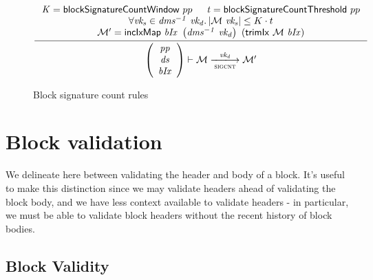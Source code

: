 \documentclass[11pt,a4paper]{article}
\newcommand{\var}[1]{\mathit{#1}}
\newcommand{\fun}[1]{\mathsf{#1}}
\newcommand{\size}[1]{\left| #1 \right|}
\newcommand{\trans}[2]{\xlongrightarrow[\textsc{#1}]{#2}}
\newcommand{\signmapname}{\mathcal{M}}
\newcommand{\trimixname}{trimIx}
\newcommand{\incixmapname}{incIxMap}
\newcommand{\signmap}[1]{\fun{\signmapname} ~ #1}
\newcommand{\trimix}[2]{\fun{\trimixname} ~ #1 ~ #2}
\newcommand{\incixmap}[3]{\fun{\incixmapname} ~ #1 ~ #2 ~ #3}
\begin{document}
\begin{figure}[ht]
  \begin{equation*}
    \inference
    {
      \var{K} = \fun{blockSignatureCountWindow} ~ pp & \var{t} = \fun{blockSignatureCountThreshold} ~ pp \\
      \forall \var{vk_s} \in \var{dms^{-1}} ~ \var{vk_d} . \size{\signmap{\var{vk_s}}} \leq K \cdot t \\
      \signmapname' = \incixmap{\var{bIx}}{\left( \var{dms^{-1}} ~ \var{vk_d} \right)}{(\trimix{\signmapname}{\var{bIx}})}
    }
    {
      \left(
        {\begin{array}{c}
          \var{pp} \\
          \var{ds} \\
          \var{bIx}
        \end{array}}
      \right)
      \vdash
        {\signmapname}
      \trans{sigcnt}{\var{vk_d}}
        {\signmapname'}
    }
    \label{eq:rule:sigcnt}
  \end{equation*}
  \caption{Block signature count rules}
  \label{fig:rules:sigcnt}
\end{figure}

\clearpage

\section{Block validation}
\label{sec:block-validation}

We delineate here between validating the header and body of a block. It's useful
to make this distinction since we may validate headers ahead of validating the
block body, and we have less context available to validate headers - in
particular, we must be able to validate block headers without the recent history
of block bodies.


\subsection{Block Validity}
\label{sec:block-valid}
\end{document}
